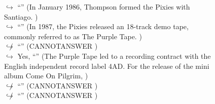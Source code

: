 \documentclass[11pt,a4paper, onecolumn]{article}
\begin{document}
\begin{figure}[t] \small \begin{tcolorbox}[boxsep=0pt,left=5pt,right=0pt,top=2pt,colback = yellow!5] \begin{dialogue}
 \small 
\colorbox{pink!25}{$\hookrightarrow$}
{ ``'' (In January 1986, Thompson formed the Pixies with Santiago. ) }
\\
\colorbox{pink!25}{$\hookrightarrow$}
{ ``'' (In 1987, the Pixies released an 18-track demo tape, commonly referred to as The Purple Tape. ) }
\\
\colorbox{pink!25}{$\not\hookrightarrow$}
{ ``'' (CANNOTANSWER ) }
\\
\colorbox{pink!25}{$\hookrightarrow$}
\colorbox{red!25}{Yes,}
{ ``'' (The Purple Tape led to a recording contract with the English independent record label 4AD. For the release of the mini album Come On Pilgrim, ) }
\\
\colorbox{pink!25}{$\not\hookrightarrow$}
{ ``'' (CANNOTANSWER ) }
\\
\colorbox{pink!25}{$\not\hookrightarrow$}
{ ``'' (CANNOTANSWER ) }
\\
 \end{dialogue}\end{tcolorbox}\end{figure}
\end{document}
